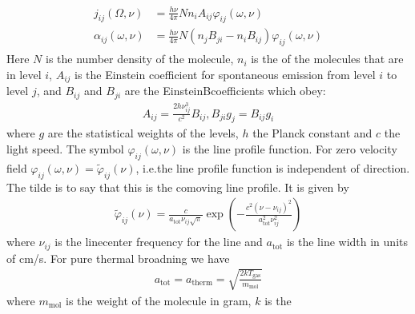 \documentclass[letterpaper,10pt,english]{sphinxmanual}
\begin{document}
\label{\detokenize{lineradtrans:eq-molec-emis-def}}\label{\detokenize{lineradtrans:eq-molec-extinct-def}}\begin{equation*}
\begin{split}\begin{split}
j_{ij}(\Omega,\nu) &= \frac{h\nu}{4\pi}Nn_iA_{ij}
\varphi_{ij}(\omega,\nu) \\
\alpha_{ij}(\omega,\nu) &= \frac{h\nu}{4\pi}N(n_jB_{ji}-n_iB_{ij})
\varphi_{ij}(\omega,\nu)
\end{split}\end{split}
\end{equation*}
Here \(N\) is the number density of the molecule, \(n_i\) is the  of the molecules that are in level \(i\), \(A_{ij}\) is the
Einstein coefficient for spontaneous emission from level \(i\) to level
\(j\), and \(B_{ij}\) and \(B_{ji}\) are the Einstein\sphinxhyphen{}B\sphinxhyphen{}coefficients which obey:
\begin{equation*}
\begin{split}A_{ij}     = \frac{2h\nu_{ij}^3}{c^2} B_{ij},
B_{ji}g_j  = B_{ij} g_i\end{split}
\end{equation*}
where \(g\) are the statistical weights of the levels, \(h\) the Planck constant
and \(c\) the light speed. The symbol \(\varphi_{ij}(\omega,\nu)\) is the line
profile function. For zero velocity field
\(\varphi_{ij}(\omega,\nu)=\tilde\varphi_{ij}(\nu)\), i.e.the line profile
function is independent of direction. The tilde is to say that this is
the comoving line profile. It is given by
\begin{equation*}
\begin{split}\tilde\varphi_{ij}(\nu) = \frac{c}{a_{\mathrm{tot}}\nu_{ij}\sqrt{\pi}}
\exp\left(-\frac{c^2(\nu-\nu_{ij})^2}{a_{\mathrm{tot}}^2\nu_{ij}^2}\right)\end{split}
\end{equation*}
where \(\nu_{ij}\) is the line\sphinxhyphen{}center frequency for the line and
\(a_{\mathrm{tot}}\) is the line width in units of cm/s. For pure
thermal broadning we have
\begin{equation*}
\begin{split}a_{\mathrm{tot}}=a_{\mathrm{therm}}=\sqrt{\frac{2kT_{\mathrm{gas}}}{m_{\mathrm{mol}}}}\end{split}
\end{equation*}
where \(m_{\mathrm{mol}}\) is the weight of the molecule in gram, \(k\) is the
\end{document}
